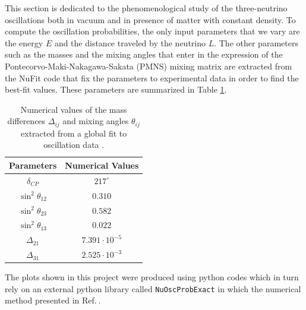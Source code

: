 \documentclass[twocolumn,secnumarabic,amssymb, nobibnotes, aps, prd,10pt]{revtex4-1}
\newcommand{\myref}[1]{Ref.$\:$\cite{#1}}
\begin{document}
This section is dedicated to the phenomenological study of the three-neutrino oscillations
both in vacuum and in presence of matter with constant density. To compute the oscillation
probabilities, the only input parameters that we vary are the energy $E$ and the distance
traveled by the neutrino $L$. The other parameters such as the masses and the mixing angles
that enter in the expression of the Pontecorvo-Maki-Nakagawa-Sakata (PMNS) mixing matrix are 
extracted from the NuFit \cite{Esteban:2018azc} code that fix the parameters to experimental 
data in order to find the best-fit values. These parameters are summarized in Table \ref{tab:params}.
\begin{table}[!ht]
\centering
\begin{tabular}[t]{|c|c|}
\hline
\textbf{Parameters} 		& \textbf{Numerical Values} \\
\hline
$\delta_{CP}$			& $217^{\circ}$  \\
\hline
$\sin^2 \theta_{12}$		& $0.310$ \\
\hline
$\sin^2 \theta_{23}$		& $0.582$ \\
\hline
$\sin^2 \theta_{13}$		& $0.022$ \\
\hline
$\Delta_{21}$			& $7.391 \cdot 10^{-5}$ \\
\hline
$\Delta_{31}$			& $2.525 \cdot 10^{-3}$ \\
\hline
\end{tabular}
\caption{Numerical values of the mass differences $\Delta_{ij}$ and mixing angles
$\theta_{ij}$ extracted from a global fit to oscillation data \cite{Esteban:2018azc}.}
\label{tab:params}
\end{table}

The plots shown in this project were produced using python codes \cite{TjNeutrino2020}
which in turn rely on an external python library called \texttt{NuOscProbExact} in which 
the numerical method presented in \myref{Bustamante:2019ggq}.
\end{document}
